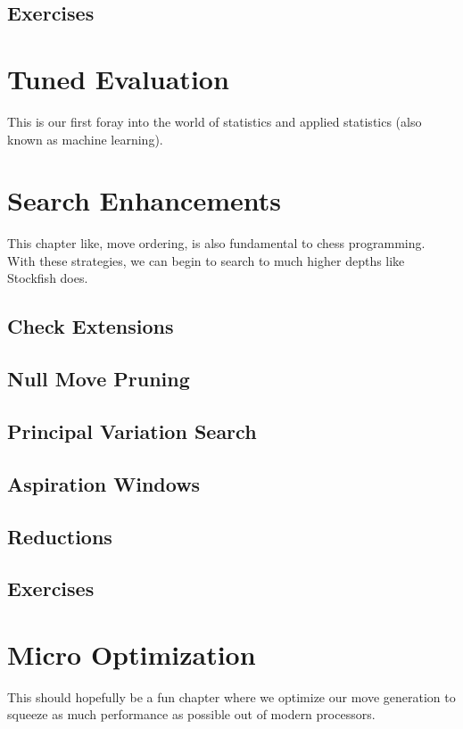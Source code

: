 \documentclass[letterpaper,11pt]{article}
\begin{document}
\subsection{Exercises}


\section{Tuned Evaluation}

This is our first foray into the world of statistics and applied statistics (also known as machine learning).

\section{Search Enhancements}

This chapter like, move ordering, is also fundamental to chess programming. With these strategies, 
we can begin to search to much higher depths like Stockfish does.

\subsection{Check Extensions}
\subsection{Null Move Pruning}
\subsection{Principal Variation Search}
\subsection{Aspiration Windows}
\subsection{Reductions}
\subsection{Exercises}

\section{Micro Optimization}

This should hopefully be a fun chapter where we optimize our move generation to squeeze as much performance 
as possible out of modern processors.
\end{document}
